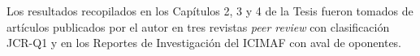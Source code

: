 Los resultados recopilados en los Capítulos 2, 3 y 4 de la Tesis fueron tomados de artículos \cite{naranjo2021locally,naranjo2023jacobian,naranjo2023computing} publicados por el autor en tres revistas \textit{peer review} con clasificación JCR-Q1 y en los Reportes de Investigación del ICIMAF \cite{naranjo2022RT,naranjo2023RT} con aval de oponentes.  


